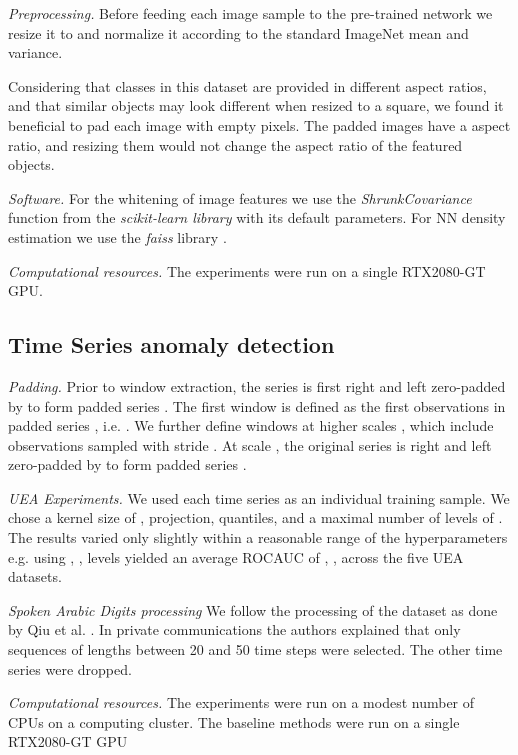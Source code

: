 \documentclass{article}
\begin{document}
 \textit{Preprocessing.} Before feeding each image sample to the pre-trained network we resize it to  and normalize it according to the standard ImageNet mean and variance.
 
 Considering that classes in this dataset are provided in different aspect ratios, and that similar objects may look different when resized to a square, we found it beneficial to pad each image with empty pixels. The padded images have a  aspect ratio, and resizing them would not change the aspect ratio of the featured objects.



\textit{Software.} 
For the whitening of image features we use the \textit{ShrunkCovariance} function from the \textit{scikit-learn library} \cite{scikit-learn} with its default parameters. For NN density estimation we use the \textit{faiss} library \cite{johnson2019billion}.

\textit{Computational resources.} The experiments were run on a single RTX2080-GT GPU.


\subsection{Time Series  anomaly detection}
\label{app:imp_ts}

\textit{Padding.} Prior to window extraction, the series  is first right and left zero-padded by  to form padded series . The first window  is defined as the first  observations in padded series , i.e. . We further define windows at higher scales , which include observations sampled with stride . At scale , the original series  is right and left zero-padded by  to form padded series . 

\textit{UEA Experiments.} We used each time series as an individual training sample. We chose a kernel size of ,  projection,  quantiles, and a maximal number of levels of . The results varied only slightly within a reasonable range of the hyperparameters e.g. using , ,  levels yielded an average ROCAUC of , ,  across the five UEA datasets.

\textit{Spoken Arabic Digits processing}  We follow the processing of the dataset as done by Qiu et al. \cite{qiu2021neural}.
 In private communications the authors explained that only sequences of lengths between 20 and 50 time steps were selected. The other time series were dropped.

\textit{Computational resources.} The experiments were run on a modest number of CPUs on a computing cluster. The baseline methods were run on a single RTX2080-GT GPU
\end{document}
